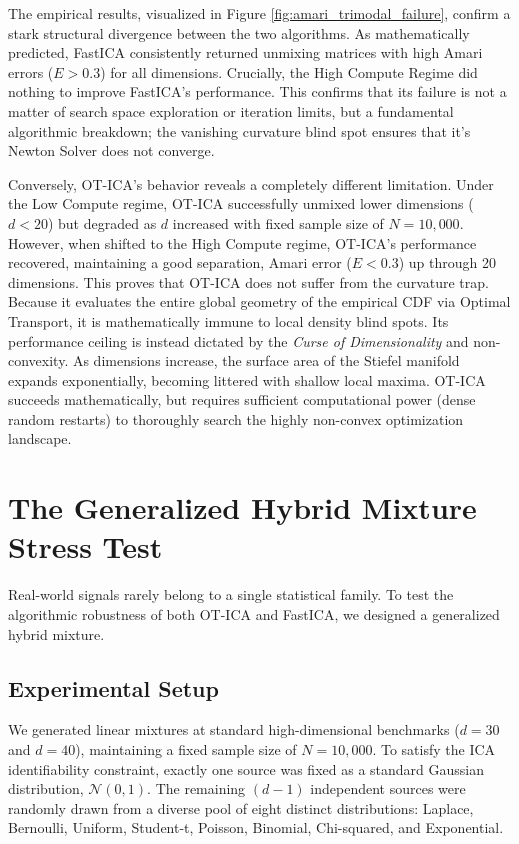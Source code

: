 \documentclass[12pt,a4paper,twoside,openany]{book}
\begin{document}
The empirical results, visualized in Figure \ref{fig:amari_trimodal_failure}, confirm a stark structural divergence between the two algorithms. 
As mathematically predicted, FastICA consistently returned unmixing matrices with high Amari errors ($E > 0.3$) for all dimensions. 
Crucially, the High Compute Regime did nothing to improve FastICA's performance. This confirms that its failure is not a matter 
of search space exploration or iteration limits, but a fundamental algorithmic breakdown; the vanishing curvature blind spot ensures that
it's Newton Solver does not converge.

Conversely, OT-ICA's behavior reveals a completely different limitation. Under the Low Compute regime, OT-ICA successfully unmixed 
lower dimensions ($d < 20$) but degraded as $d$ increased with fixed sample size of $N=10,000$. However, when shifted to the High Compute regime, 
OT-ICA's performance recovered, maintaining a good separation, Amari error ($E < 0.3$) up through 20 dimensions. This proves that OT-ICA does not 
suffer from the curvature trap. Because it evaluates the entire global geometry of the empirical CDF via Optimal Transport, 
it is mathematically immune to local density blind spots. Its performance ceiling is instead dictated by the 
\textit{Curse of Dimensionality} and non-convexity. As dimensions increase, the surface area of the Stiefel manifold expands exponentially, 
becoming littered with shallow local maxima. OT-ICA succeeds mathematically, but requires sufficient computational power (dense random restarts) 
to thoroughly search the highly non-convex optimization landscape.

\section{The Generalized Hybrid Mixture Stress Test}
Real-world signals rarely belong to a single statistical family. To test the algorithmic robustness of both OT-ICA and FastICA, 
we designed a generalized hybrid mixture.

\subsection{Experimental Setup}
We generated linear mixtures at standard high-dimensional benchmarks ($d=30$ and $d=40$), maintaining a fixed sample size of $N=10,000$. 
To satisfy the ICA identifiability constraint, exactly one source was fixed as a standard Gaussian distribution, $\mathcal{N}(0,1)$. 
The remaining $(d-1)$ independent sources were randomly drawn from a diverse pool of eight distinct distributions: 
Laplace, Bernoulli, Uniform, Student-t, Poisson, Binomial, Chi-squared, and Exponential. 
\end{document}
